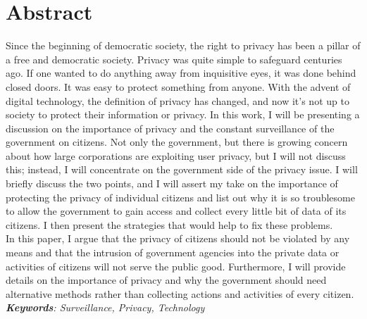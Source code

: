 \documentclass[11pt]{report}
\begin{document}
\section*{Abstract}
Since the beginning of democratic society, the right to privacy has been a pillar of a free and democratic society. Privacy was quite simple to safeguard centuries ago. If one wanted to do anything away from inquisitive eyes, it was done behind closed doors. It was easy to protect something from anyone. With the advent of digital technology, the definition of privacy has changed, and now it's not up to society to protect their information or privacy. In this work, I will be presenting a discussion on the importance of privacy and the constant surveillance of the government on citizens. Not only the government, but there is growing concern about how large corporations are exploiting user privacy, but I will not discuss this; instead, I will concentrate on the government side of the privacy issue. I will briefly discuss the two points, and I will assert my take on the importance of protecting the privacy of individual citizens and list out why it is so troublesome to allow the government to gain access and collect every little bit of data of its citizens. I then present the strategies that would help to fix these problems.\\ 

In this paper, I argue that the privacy of citizens should not be violated by any means and that the intrusion of government agencies into the private data or activities of citizens will not serve the public good. Furthermore, I will provide details on the importance of privacy and why the government should need alternative methods rather than collecting actions and activities of every citizen.\\

\textit{\textbf{Keywords}: Surveillance, Privacy, Technology}
\end{document}
